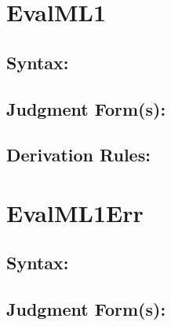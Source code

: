 \documentclass[11pt]{jarticle}
\begin{document}
\newpage

\section*{EvalML1}



\subsection*{Syntax:}

\EvalMLiDisplayBNF

\subsection*{Judgment Form(s):}


\subsection*{Derivation Rules:}
\EvalMLiDisplayRules

\newpage

\section*{EvalML1Err}



\subsection*{Syntax:}

\EvalMLiErrDisplayBNF

\subsection*{Judgment Form(s):}

\end{document}
